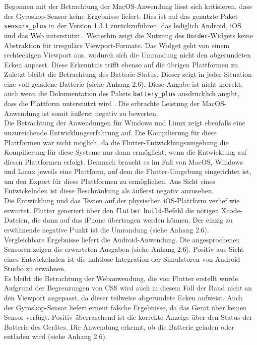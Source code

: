 \documentclass[a4paper]{scrartcl}
\begin{document}
Begonnen mit der Betrachtung der MacOS-Anwendung lässt sich kritisieren, dass der Gyroskop-Sensor keine Ergebnisse liefert. Dies ist auf das genutzte Paket \texttt{sensors\_plus} in der Version 1.3.1 zurückzuführen, das lediglich Android, iOS und das Web unterstützt \autocite{sensors_plus}. Weiterhin zeigt die Nutzung des \texttt{Border}-Widgets keine Abstraktion für irreguläre Viewport-Formate. Das Widget geht von einem rechteckigen Viewport aus, wodurch sich die Umrandung nicht den abgerundeten Ecken anpasst. Diese Erkenntnis trifft ebenso auf die übrigen Plattformen zu. Zuletzt bleibt die Betrachtung des Batterie-Status. Dieser zeigt in jeder Situation eine voll geladene Batterie (siehe Anhang 2.6). Diese Angabe ist nicht korrekt, auch wenn die Dokumentation des Pakets \texttt{battery\_plus} ausdrücklich angibt, dass die Plattform unterstützt wird \autocite{battery_plus}. Die erbrachte Leistung der MacOS-Anwendung ist somit äußerst negativ zu bewerten. \\

Die Betrachtung der Anwendungen für Windows und Linux zeigt ebenfalls eine unzureichende Entwicklungserfahrung auf. Die Kompilierung für diese Plattformen war nicht möglich, da die Flutter-Entwicklungsumgebung die Kompilierung für diese Systeme nur dann ermöglicht, wenn die Entwicklung auf diesen Plattformen erfolgt. Demnach braucht es im Fall von MacOS, Windows und Linux jeweils eine Plattform, auf dem die Flutter-Umgebung eingerichtet ist, um den Export für diese Plattformen zu ermöglichen. Aus Sicht eines Entwickelnden ist diese Beschränkung als äußerst negativ anzusehen. \\

Die Entwicklung und das Testen auf der physischen iOS-Plattform verlief wie erwartet. Flutter generiert über den \texttt{flutter build}-Befehl die nötigen Xcode-Dateien, die dann auf das iPhone übertragen werden können. Der einzig zu erwähnende negative Punkt ist die Umrandung (siehe Anhang 2.6). \\

Vergleichbare Ergebnisse liefert die Android-Anwendung. Die angesprochenen Sensoren zeigen die erwarteten Ausgaben (siehe Anhang 2.6). Positiv aus Sicht eines Entwickelnden ist die nahtlose Integration der Simulatoren von Android-Studio zu erwähnen. \\

Es bleibt die Betrachtung der Webanwendung, die von Flutter erstellt wurde. Aufgrund der Begrenzungen von CSS wird auch in diesem Fall der Rand nicht an den Viewport angepasst, da dieser teilweise abgerundete Ecken aufweist. Auch der Gyroskop-Sensor liefert erneut falsche Ergebnisse, da das Gerät über keinen  Sensor verfügt. Positiv überraschend ist die korrekte Anzeige über den Status der Batterie des Gerätes. Die Anwendung erkennt, ob die Batterie geladen oder entladen wird (siehe Anhang 2.6). \\
\end{document}

